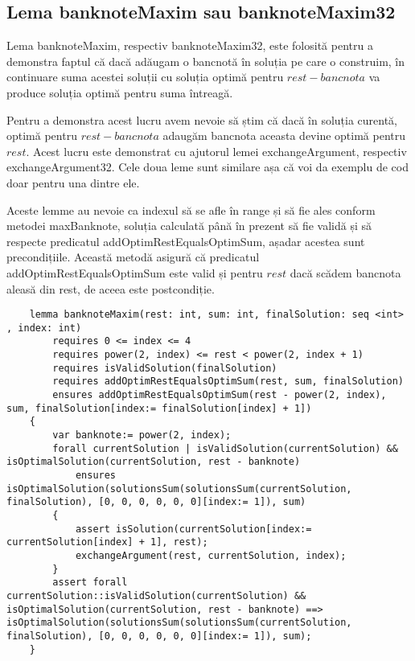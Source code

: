     \subsection{Lema banknoteMaxim sau banknoteMaxim32}
    Lema banknoteMaxim,  respectiv banknoteMaxim32, este folosită pentru a demonstra faptul că dacă adăugam o bancnotă în soluția pe care o 
    construim, în continuare suma acestei soluții cu soluția optimă pentru $ rest - bancnota$ va produce soluția 
    optimă pentru suma întreagă.\par
    Pentru a demonstra acest lucru avem nevoie să știm că dacă în soluția curentă, optimă pentru $ rest - bancnota$  
    adaugăm bancnota aceasta devine optimă pentru $rest$. Acest lucru este demonstrat cu ajutorul lemei exchangeArgument, respectiv exchangeArgument32.
    Cele doua leme sunt similare așa că voi da exemplu de cod doar pentru una dintre ele.\par
    Aceste lemme au nevoie ca indexul să se afle în range și să fie ales conform metodei maxBanknote, soluția calculată până 
    în prezent să fie validă și să respecte predicatul addOptimRestEqualsOptimSum, așadar acestea sunt precondițiile.
    Această metodă asigură că predicatul addOptimRestEqualsOptimSum este valid și pentru $rest $ dacă scădem bancnota aleasă din rest, 
    de aceea este postcondiție.
    \begin{lstlisting}
    lemma banknoteMaxim(rest: int, sum: int, finalSolution: seq <int> , index: int)
        requires 0 <= index <= 4
        requires power(2, index) <= rest < power(2, index + 1)
        requires isValidSolution(finalSolution)
        requires addOptimRestEqualsOptimSum(rest, sum, finalSolution)
        ensures addOptimRestEqualsOptimSum(rest - power(2, index), sum, finalSolution[index:= finalSolution[index] + 1]) 
    {
        var banknote:= power(2, index);
        forall currentSolution | isValidSolution(currentSolution) && isOptimalSolution(currentSolution, rest - banknote)
            ensures isOptimalSolution(solutionsSum(solutionsSum(currentSolution, finalSolution), [0, 0, 0, 0, 0, 0][index:= 1]), sum) 
        {
            assert isSolution(currentSolution[index:= currentSolution[index] + 1], rest);
            exchangeArgument(rest, currentSolution, index);
        }
        assert forall currentSolution::isValidSolution(currentSolution) && isOptimalSolution(currentSolution, rest - banknote) ==> isOptimalSolution(solutionsSum(solutionsSum(currentSolution, finalSolution), [0, 0, 0, 0, 0, 0][index:= 1]), sum);
    }
    \end{lstlisting}

